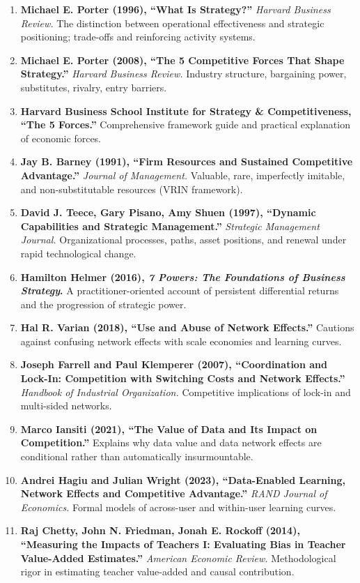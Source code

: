 \begin{enumerate}
    \item \textbf{Michael E. Porter (1996), ``What Is Strategy?''} \textit{Harvard Business Review.} The distinction between operational effectiveness and strategic positioning; trade-offs and reinforcing activity systems.
    \item \textbf{Michael E. Porter (2008), ``The 5 Competitive Forces That Shape Strategy.''} \textit{Harvard Business Review.} Industry structure, bargaining power, substitutes, rivalry, entry barriers.
    \item \textbf{Harvard Business School Institute for Strategy \& Competitiveness, ``The 5 Forces.''} Comprehensive framework guide and practical explanation of economic forces.
    \item \textbf{Jay B. Barney (1991), ``Firm Resources and Sustained Competitive Advantage.''} \textit{Journal of Management.} Valuable, rare, imperfectly imitable, and non-substitutable resources (VRIN framework).
    \item \textbf{David J. Teece, Gary Pisano, Amy Shuen (1997), ``Dynamic Capabilities and Strategic Management.''} \textit{Strategic Management Journal.} Organizational processes, paths, asset positions, and renewal under rapid technological change.
    \item \textbf{Hamilton Helmer (2016), \textit{7 Powers: The Foundations of Business Strategy}.} A practitioner-oriented account of persistent differential returns and the progression of strategic power.
    \item \textbf{Hal R. Varian (2018), ``Use and Abuse of Network Effects.''} Cautions against confusing network effects with scale economies and learning curves.
    \item \textbf{Joseph Farrell and Paul Klemperer (2007), ``Coordination and Lock-In: Competition with Switching Costs and Network Effects.''} \textit{Handbook of Industrial Organization.} Competitive implications of lock-in and multi-sided networks.
    \item \textbf{Marco Iansiti (2021), ``The Value of Data and Its Impact on Competition.''} Explains why data value and data network effects are conditional rather than automatically insurmountable.
    \item \textbf{Andrei Hagiu and Julian Wright (2023), ``Data-Enabled Learning, Network Effects and Competitive Advantage.''} \textit{RAND Journal of Economics.} Formal models of across-user and within-user learning curves.
    \item \textbf{Raj Chetty, John N. Friedman, Jonah E. Rockoff (2014), ``Measuring the Impacts of Teachers I: Evaluating Bias in Teacher Value-Added Estimates.''} \textit{American Economic Review.} Methodological rigor in estimating teacher value-added and causal contribution.

\end{enumerate}
